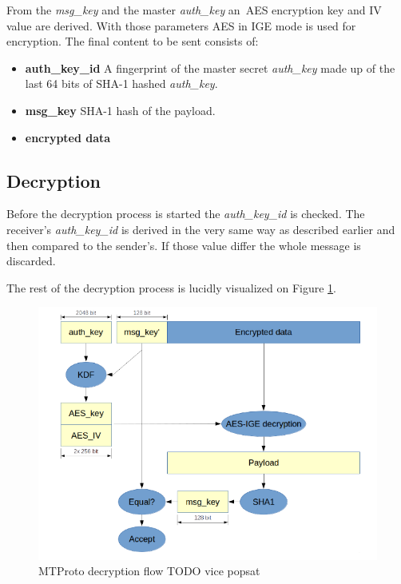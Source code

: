 \documentclass[thesis=M,english]{FITthesis}[2012/10/20]
\begin{document}
From the \emph{msg\_key} and the master \emph{auth\_key} an~AES encryption key and IV value are derived. With those parameters AES in IGE mode is used for encryption. The final content to be sent consists of:

\begin{itemize}
	\item  \textbf{auth\_key\_id} A fingerprint of the master secret \emph{auth\_key} made up of the last 64 bits of SHA-1 hashed \emph{auth\_key}.
	\item  \textbf{msg\_key} SHA-1 hash of the payload.
	\item  \textbf{encrypted data}
\end{itemize}


\subsection{Decryption}

Before the decryption process is started the \emph{auth\_key\_id} is checked. The receiver's \emph{auth\_key\_id} is derived in the very same way as described earlier and then compared to the sender's. If those value differ the whole message is discarded.

The rest of the decryption process is lucidly visualized on Figure \ref{img:telegram-decflow}.

\begin{figure}[htb]
	\centering
	\includegraphics[width=1\textwidth]{telegram-decflow.png}
	\caption{MTProto decryption flow \cite{telegram-aarhus} TODO vice popsat}
	\label{img:telegram-decflow}
\end{figure}
\end{document}
